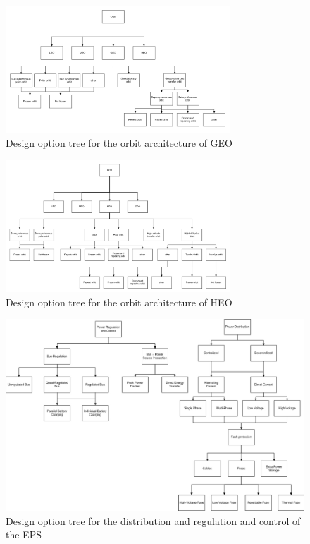 \begin{figure}
\centering
  \includegraphics[width=0.75\textwidth,angle=0]{chapters/img/blDOOrb2.jpg}
	\caption{Design option tree for the orbit architecture of \ac{GEO}}
	\label{DOOrb2}
\end{figure}

\begin{figure}
\centering
  \includegraphics[width=0.75\textwidth,angle=0]{chapters/img/blDOOrb3.jpg}
	\caption{Design option tree for the orbit architecture of \ac{HEO}}
	\label{DOOrb3}
\end{figure}

\begin{figure}
\centering
\includegraphics[width=1.0\textwidth, angle=90]{chapters/img/DOTeps_reganddis.jpg}
\caption{Design option tree for the distribution and regulation and control of the \ac{EPS}}
\label{pic_DOTeps_reganddis}
\end{figure}

